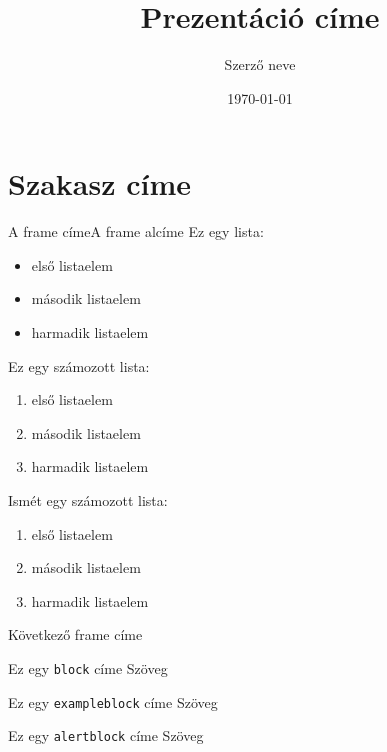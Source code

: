 \documentclass{beamer}
\begin{document}
\title[Cím]{Prezentáció címe}
\author[Szerző]{Szerző neve}
\date{\today}
\maketitle

\section{Szakasz címe}

\begin{frame}{A frame címe}{A frame alcíme}\pause
\transdissolve[duration=0.2]
Ez egy lista:\pause
\begin{itemize}
  \item első listaelem\pause
  \item második listaelem\pause
  \item harmadik listaelem\pause
\end{itemize}
\par\medskip Ez egy számozott lista:\pause
\begin{enumerate}
  \item első listaelem\pause
  \item második listaelem\pause
  \item harmadik listaelem\pause
\end{enumerate}
\par\medskip Ismét egy számozott lista:\pause
\begin{enumerate}[<+>]
  \item első listaelem
  \item második listaelem
  \item harmadik listaelem
\end{enumerate}
\end{frame}

\begin{frame}{Következő frame címe}{}\pause
\transdissolve[duration=0.2]
\begin{block}{Ez egy \texttt{block} címe}
Szöveg
\end{block}\pause
\begin{exampleblock}{Ez egy \texttt{exampleblock} címe}
Szöveg
\end{exampleblock}\pause
\begin{alertblock}{Ez egy \texttt{alertblock} címe}
Szöveg
\end{alertblock}
\end{frame}
\end{document}

